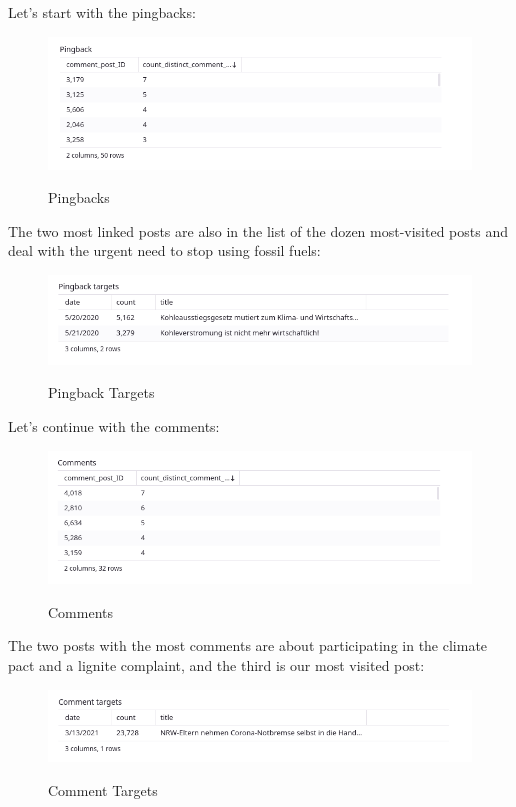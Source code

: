 Let's start with the pingbacks:

\begin{figure}[H]
\centering
\caption {Pingbacks}
\includegraphics[width=\linewidth]{images/figure15.png}
\label{fig:pingbacks}
\end{figure}

The two most linked posts are also in the list of the dozen most-visited posts and deal with the urgent need to stop using fossil fuels:

\begin{figure}[H]
\centering
\caption {Pingback Targets}
\includegraphics[width=\linewidth]{images/figure16.png}
\label{fig:pingbackTargets}
\end{figure}

Let's continue with the comments:

\begin{figure}[H]
\centering
\caption {Comments}
\includegraphics[width=\linewidth]{images/figure17.png}
\label{fig:comments}
\end{figure}

The two posts with the most comments are about participating in  the climate pact and a lignite complaint, and the third is our most visited post:

\begin{figure}[H]
\centering
\caption {Comment Targets}
\includegraphics[width=\linewidth]{images/figure18.png}
\label{fig:commentTarget}
\end{figure}

